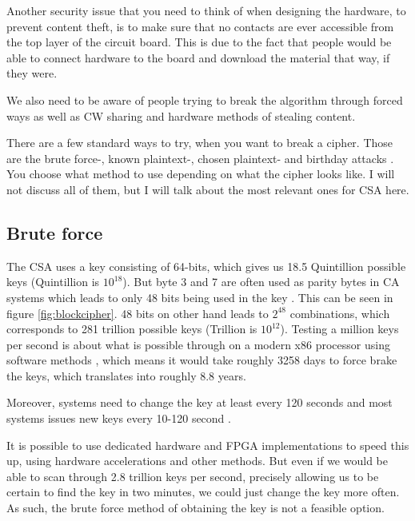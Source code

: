 Another security issue that you need to think of when designing the 
hardware, to prevent content theft, is to make sure that no contacts 
are ever accessible from the top layer of the circuit board. This is 
due to the fact that people would be able to connect hardware to the 
board and download the material that way, if they were. 

We also need to be aware of people trying to break the algorithm 
through forced ways as well as CW sharing and hardware methods of 
stealing content.


There are a few standard ways to try, when you want to break a cipher. 
Those are the brute force-, known plaintext-, chosen plaintext- and 
birthday attacks \citep[pp. 31-34]{Schneier:2003}. You choose what 
method to use depending on what the cipher looks like. I will not 
discuss all of them, but I will talk about the most relevant ones for 
CSA here.

\subsection{Brute force}
The CSA uses a key consisting of 64-bits, which gives us 18.5 
Quintillion possible keys (Quintillion is $10^{18}$). But byte 3 and 7 
are often used as parity bytes in CA systems which leads to only 48 
bits being used in the key \citep{Breaking:2012}. This can be seen in 
figure \ref{fig:blockcipher}. 48 bits on other hand leads to $2^{48}$ 
combinations, which corresponds to 281 trillion possible keys (Trillion 
is $10^{12}$). Testing a million keys per second is about what is 
possible through on a modern x86 processor using software methods
, which means it would take 
roughly 3258 days to force brake the keys, which translates into 
roughly 8.8 years.

Moreover, systems need to change the key at least every 120 seconds 
\citep{Simpson:2009} and most systems issues new keys every 10-120 
second \citep{Wirt:2004}.

It is possible to use dedicated hardware and FPGA implementations to 
speed this up, using hardware accelerations and other methods. But even 
if we would be able to scan through 2.8 trillion keys per second, 
precisely allowing us to be certain to find the key in two minutes, we 
could just change the key more often. As such, the brute force method 
of obtaining the key is not a feasible option.

